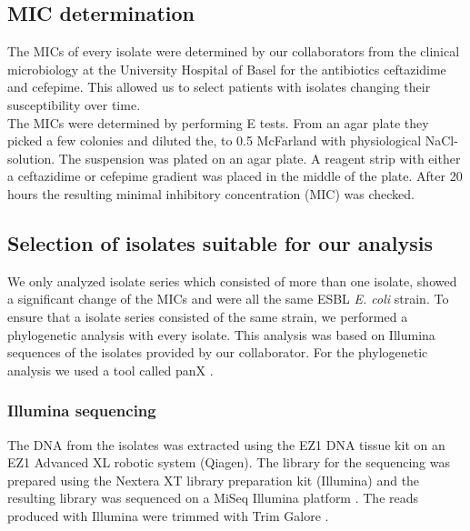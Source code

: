 \subsection{MIC determination}
The MICs of every isolate were determined by our collaborators from the clinical microbiology at the University Hospital of Basel for the antibiotics ceftazidime and cefepime. This allowed us to select patients with isolates changing their susceptibility over time. \\
The MICs were determined by performing E tests. From an agar plate they picked a few colonies and diluted the, to 0.5 McFarland with physiological NaCl-solution. The suspension was plated on an agar plate. A reagent strip with either a ceftazidime or cefepime gradient was placed in the middle of the plate. After 20 hours the resulting minimal inhibitory concentration (MIC) was checked.

\subsection{Selection of isolates suitable for our analysis}
We only analyzed isolate series which consisted of more than one isolate, showed a significant change of the MICs and were all the same ESBL \textit{E. coli} strain. To ensure that a isolate series consisted of the same strain, we performed a phylogenetic analysis with every isolate. This analysis was based on Illumina sequences of the isolates provided by our collaborator. For the phylogenetic analysis we used a tool called panX \cite{ding_panx:_2018}.

\subsubsection{Illumina sequencing}
The DNA from the isolates was extracted using the EZ1 DNA tissue kit on an EZ1 Advanced XL robotic system (Qiagen). The library for the sequencing was prepared using the Nextera XT library preparation kit (Illumina) and the resulting library was sequenced on a MiSeq Illumina platform \cite{nanopore}. The reads produced with Illumina were trimmed with Trim Galore \cite{noauthor_babraham_nodate}.
\label{section:illumina}

